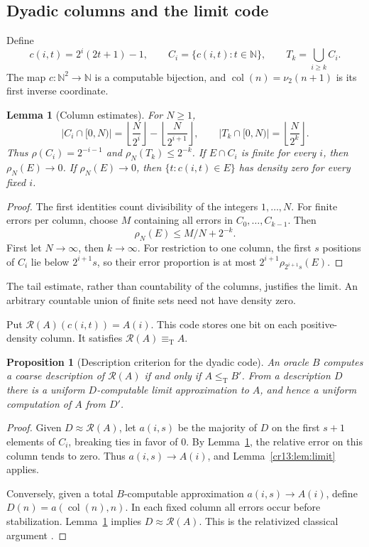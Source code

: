 \documentclass[11pt,letterpaper]{article}
\newtheorem{lemma}[theorem]{Lemma}
\newtheorem{proposition}[theorem]{Proposition}
\theoremstyle{definition}
\theoremstyle{remark}\newtheorem{remark}[theorem]{Remark}
\numberwithin{equation}{section}
\newcommand{\N}{\mathbb N}
\newcommand{\leT}{\leq_{\mathrm T}}
\newcommand{\eqT}{\equiv_{\mathrm T}}
\newcommand{\Rc}{\mathcal R}
\newcommand{\col}{\operatorname{col}}
\begin{document}
\subsection{Dyadic columns and the limit code}
Define
\begin{equation}\label{cr13:eq:columns}
 c(i,t)=2^i(2t+1)-1,\qquad
 C_i=\{c(i,t):t\in\N\},\qquad
 T_k=\bigcup_{i\ge k}C_i.
\end{equation}
The map $c:\N^2\to\N$ is a computable bijection, and $\col(n)=\nu_2(n+1)$ is its first inverse coordinate.

\begin{lemma}[Column estimates]\label{cr13:lem:columns}
For $N\ge1$,
\[
 |C_i\cap[0,N)|=\left\lfloor\frac N{2^i}\right\rfloor-
                  \left\lfloor\frac N{2^{i+1}}\right\rfloor,
 \qquad |T_k\cap[0,N)|=\left\lfloor\frac N{2^k}\right\rfloor.
\]
Thus $\rho(C_i)=2^{-i-1}$ and $\rho_N(T_k)\le2^{-k}$. If $E\cap C_i$ is finite for every $i$, then $\rho_N(E)\to0$. If $\rho_N(E)\to0$, then $\{t:c(i,t)\in E\}$ has density zero for every fixed $i$.
\end{lemma}
\begin{proof}
The first identities count divisibility of the integers $1,\ldots,N$. For finite errors per column, choose $M$ containing all errors in $C_0,\ldots,C_{k-1}$. Then
\begin{equation}\label{cr13:eq:tailbound}
                       \rho_N(E)\le M/N+2^{-k}.
\end{equation}
First let $N\to\infty$, then $k\to\infty$. For restriction to one column, the first $s$ positions of $C_i$ lie below $2^{i+1}s$, so their error proportion is at most $2^{i+1}\rho_{2^{i+1}s}(E)$.
\end{proof}
The tail estimate, rather than countability of the columns, justifies the limit. An arbitrary countable union of finite sets need not have density zero.

Put $\Rc(A)(c(i,t))=A(i)$. This code stores one bit on each positive-density column. It satisfies $\Rc(A)\eqT A$.

\begin{proposition}[Description criterion for the dyadic code]\label{cr13:prop:dyadic}
An oracle $B$ computes a coarse description of $\Rc(A)$ if and only if $A\leT B'$. From a description $D$ there is a uniform $D$-computable limit approximation to $A$, and hence a uniform computation of $A$ from $D'$.
\end{proposition}
\begin{proof}
Given $D\approx\Rc(A)$, let $a(i,s)$ be the majority of $D$ on the first $s+1$ elements of $C_i$, breaking ties in favor of $0$. By Lemma~\ref{cr13:lem:columns}, the relative error on this column tends to zero. Thus $a(i,s)\to A(i)$, and Lemma~\ref{cr13:lem:limit} applies.

Conversely, given a total $B$-computable approximation $a(i,s)\to A(i)$, define $D(n)=a(\col(n),n)$. In each fixed column all errors occur before stabilization. Lemma~\ref{cr13:lem:columns} implies $D\approx\Rc(A)$. This is the relativized classical argument \cite[Theorem 2.19]{JS}.
\end{proof}
\end{document}
